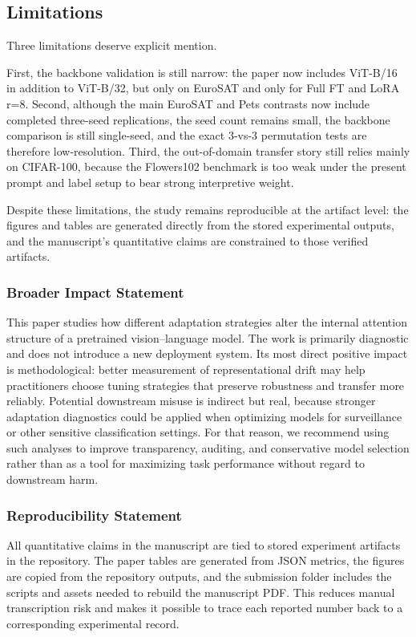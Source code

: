 \documentclass[10pt]{article}
\begin{document}
\subsection{Limitations}
Three limitations deserve explicit mention.

First, the backbone validation is still narrow: the paper now includes ViT-B/16 in addition to ViT-B/32, but only on EuroSAT and only for Full FT and LoRA r=8. Second, although the main EuroSAT and Pets contrasts now include completed three-seed replications, the seed count remains small, the backbone comparison is still single-seed, and the exact 3-vs-3 permutation tests are therefore low-resolution. Third, the out-of-domain transfer story still relies mainly on CIFAR-100, because the Flowers102 benchmark is too weak under the present prompt and label setup to bear strong interpretive weight.

Despite these limitations, the study remains reproducible at the artifact level: the figures and tables are generated directly from the stored experimental outputs, and the manuscript's quantitative claims are constrained to those verified artifacts.

\subsubsection*{Broader Impact Statement}
This paper studies how different adaptation strategies alter the internal attention structure of a pretrained vision--language model. The work is primarily diagnostic and does not introduce a new deployment system. Its most direct positive impact is methodological: better measurement of representational drift may help practitioners choose tuning strategies that preserve robustness and transfer more reliably. Potential downstream misuse is indirect but real, because stronger adaptation diagnostics could be applied when optimizing models for surveillance or other sensitive classification settings. For that reason, we recommend using such analyses to improve transparency, auditing, and conservative model selection rather than as a tool for maximizing task performance without regard to downstream harm.

\subsubsection*{Reproducibility Statement}
All quantitative claims in the manuscript are tied to stored experiment artifacts in the repository. The paper tables are generated from JSON metrics, the figures are copied from the repository outputs, and the submission folder includes the scripts and assets needed to rebuild the manuscript PDF. This reduces manual transcription risk and makes it possible to trace each reported number back to a corresponding experimental record.
\end{document}

